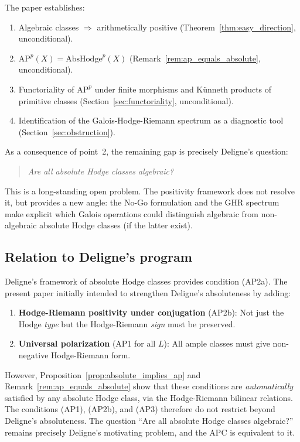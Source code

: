 \documentclass[aps,prd,twocolumn,superscriptaddress,nofootinbib]{revtex4-2}
\theoremstyle{definition}
\theoremstyle{remark}
\begin{document}
The paper establishes:
\begin{enumerate}
\item Algebraic classes $\Rightarrow$ arithmetically positive (Theorem~\ref{thm:easy_direction}, unconditional).
\item $\mathrm{AP}^p(X) = \mathrm{AbsHodge}^p(X)$ (Remark~\ref{rem:ap_equals_absolute}, unconditional).
\item Functoriality of $\mathrm{AP}^p$ under finite morphisms and K\"unneth products of primitive classes (Section~\ref{sec:functoriality}, unconditional).
\item Identification of the Galois-Hodge-Riemann spectrum as a diagnostic tool (Section~\ref{sec:obstruction}).
\end{enumerate}

As a consequence of point~2, the remaining gap is precisely Deligne's question:

\begin{quote}
\textit{Are all absolute Hodge classes algebraic?}
\end{quote}

This is a long-standing open problem. The positivity framework does not resolve it, but provides a new angle: the No-Go formulation and the GHR spectrum make explicit which Galois operations could distinguish algebraic from non-algebraic absolute Hodge classes (if the latter exist).

\subsection{Relation to Deligne's program}

Deligne's framework of absolute Hodge classes \cite{Deligne1982} provides condition (AP2a). The present paper initially intended to strengthen Deligne's absoluteness by adding:

\begin{enumerate}
\item \textbf{Hodge-Riemann positivity under conjugation} (AP2b): Not just the Hodge \textit{type} but the Hodge-Riemann \textit{sign} must be preserved.

\item \textbf{Universal polarization} (AP1 for all $L$): All ample classes must give non-negative Hodge-Riemann form.
\end{enumerate}

However, Proposition~\ref{prop:absolute_implies_ap} and Remark~\ref{rem:ap_equals_absolute} show that these conditions are \textit{automatically} satisfied by any absolute Hodge class, via the Hodge-Riemann bilinear relations. The conditions (AP1), (AP2b), and (AP3) therefore do not restrict beyond Deligne's absoluteness. The question ``Are all absolute Hodge classes algebraic?'' remains precisely Deligne's motivating problem, and the APC is equivalent to it.
\end{document}
